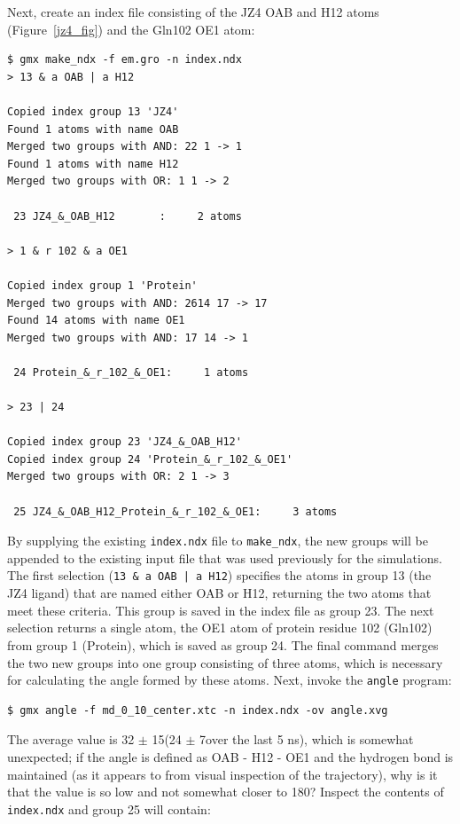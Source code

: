 \documentclass[9pt,tutorial,pubversion]{livecoms}
\begin{document}
Next, create an index file consisting of the JZ4 OAB and H12 atoms (Figure~\ref{jz4_fig}) and the Gln102 OE1 atom:

\begin{lstlisting}[basicstyle=\footnotesize\ttfamily]
$ gmx make_ndx -f em.gro -n index.ndx 
> 13 & a OAB | a H12

Copied index group 13 'JZ4'
Found 1 atoms with name OAB
Merged two groups with AND: 22 1 -> 1
Found 1 atoms with name H12
Merged two groups with OR: 1 1 -> 2

 23 JZ4_&_OAB_H12       :     2 atoms

> 1 & r 102 & a OE1

Copied index group 1 'Protein'
Merged two groups with AND: 2614 17 -> 17
Found 14 atoms with name OE1
Merged two groups with AND: 17 14 -> 1

 24 Protein_&_r_102_&_OE1:     1 atoms

> 23 | 24

Copied index group 23 'JZ4_&_OAB_H12'
Copied index group 24 'Protein_&_r_102_&_OE1'
Merged two groups with OR: 2 1 -> 3

 25 JZ4_&_OAB_H12_Protein_&_r_102_&_OE1:     3 atoms
\end{lstlisting}
%
By supplying the existing \texttt{index.ndx} file to \texttt{make\_ndx}, the new groups will be appended to the existing input file that was used previously for the simulations. The first selection (\texttt{13 \& a OAB | a H12}) specifies the atoms in group 13 (the JZ4 ligand) that are named either OAB or H12, returning the two atoms that meet these criteria. This group is saved in the index file as group 23. The next selection returns a single atom, the OE1 atom of protein residue 102 (Gln102) from group 1 (Protein), which is saved as group 24. The final command merges the two new groups into one group consisting of three atoms, which is necessary for calculating the angle formed by these atoms. Next, invoke the \texttt{angle} program:

\begin{lstlisting}
$ gmx angle -f md_0_10_center.xtc -n index.ndx -ov angle.xvg  
\end{lstlisting}
%
The average value is 32 $\pm$ 15\textdegree (24 $\pm$ 7\textdegree over the last 5 ns), which is somewhat unexpected; if the angle is defined as OAB - H12 - OE1 and the hydrogen bond is maintained (as it appears to from visual inspection of the trajectory), why is it that the value is so low and not somewhat closer to 180\textdegree? Inspect the contents of \texttt{index.ndx} and group 25 will contain:
\end{document}
